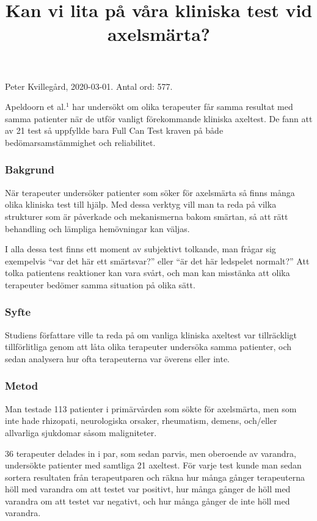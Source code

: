 \documentclass[10pt,a4paper]{article}
\title{Kan vi lita på våra kliniska test vid axelsmärta?}
\author{}
\date{}
\begin{document}
\pagestyle{empty}	

\noindent Peter Kvillegård, 2020-03-01. Antal ord: 577.
\vspace{-1em}
{\let\newpage\relax\maketitle}
\vspace{-3em}

\noindent Apeldoorn et al.$^{1}$ har undersökt om olika terapeuter får samma resultat med samma patienter när de utför vanligt förekommande kliniska axeltest. De fann att av 21 test så uppfyllde bara Full Can Test kraven på både bedömar\-sam\-stämmighet och reliabilitet.

\subsubsection*{Bakgrund}
När terapeuter undersöker patienter som söker för axelsmärta så finns många olika kliniska test till hjälp. Med dessa verktyg vill man ta reda på vilka strukturer som är påverkade och mekanismerna bakom smärtan, så att rätt behandling och lämpliga hemövningar kan väljas. 

I alla dessa test finns ett moment av subjektivt tolkande, man frågar sig exempelvis ``var det här ett smärtsvar?'' eller ``är det här ledspelet normalt?'' Att tolka patientens reaktioner kan vara svårt, och man kan misstänka att olika terapeuter bedömer samma situation på olika sätt.

\subsubsection*{Syfte}
Studiens författare ville ta reda på om vanliga kliniska axeltest var tillräckligt tillförlitliga genom att låta olika terapeuter undersöka samma patienter, och sedan analysera hur ofta terapeuterna var överens eller inte.

\subsubsection*{Metod}
Man testade 113 patienter i primärvården som sökte för axelsmärta, men som inte hade rhizopati, neurologiska orsaker, rheumatism, demens, och/eller allvarliga sjukdomar såsom maligniteter.

36 terapeuter delades in i par, som sedan parvis, men oberoende av varandra, undersökte patienter med samtliga 21 axeltest. För varje test kunde man sedan sortera resultaten från terapeutparen och räkna hur många gånger terapeuterna höll med varandra om att testet var positivt, hur många gånger de höll med varandra om att testet var negativt, och hur många gånger de inte höll med varandra.
\end{document}

